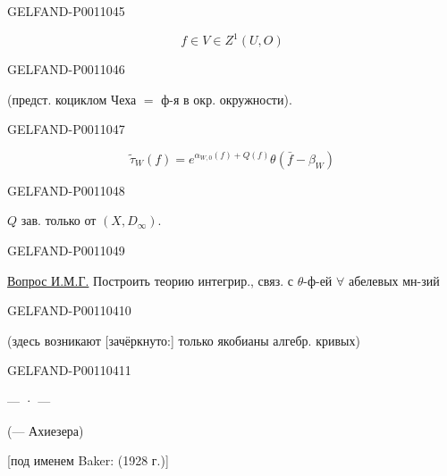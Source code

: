 \begin{GelfandAdjacentEvidence}{GELFAND-P001104}{5}


\[
f\in V\in Z^1(U,O)
\]
\end{GelfandAdjacentEvidence}
\begin{GelfandAdjacentEvidence}{GELFAND-P001104}{6}


(предст. коциклом Чеха $=$ ф-я в окр. окружности).
\end{GelfandAdjacentEvidence}
\begin{GelfandAdjacentEvidence}{GELFAND-P001104}{7}


\[
\widetilde{\tau}_W(f)=e^{\alpha_{W,0}(f)+Q(f)}\theta(\bar f-\beta_W)
\]
\end{GelfandAdjacentEvidence}
\begin{GelfandAdjacentEvidence}{GELFAND-P001104}{8}

$Q$ зав. только от $(X,D_\infty)$.
\end{GelfandAdjacentEvidence}
\begin{GelfandAdjacentEvidence}{GELFAND-P001104}{9}


\underline{Вопрос И.М.Г.} Построить теорию интегрир., связ. с $\theta$-ф-ей $\forall$ абелевых мн-зий
\end{GelfandAdjacentEvidence}
\begin{GelfandAdjacentEvidence}{GELFAND-P001104}{10}


(здесь возникают [зачёркнуто:] только якобианы алгебр. кривых)
\end{GelfandAdjacentEvidence}
\begin{GelfandAdjacentEvidence}{GELFAND-P001104}{11}


\begin{center}— · —\end{center}
 (— Ахиезера)

[под именем Baker: (1928 г.)]
\end{GelfandAdjacentEvidence}
